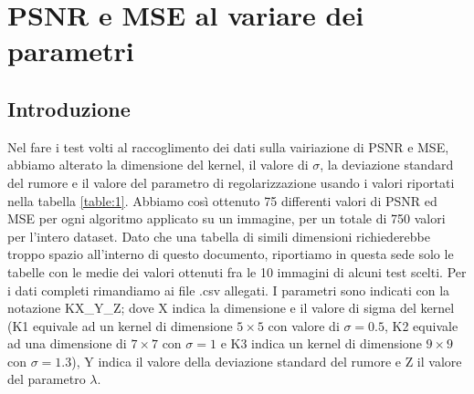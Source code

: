 \documentclass[12pt]{article}
\begin{document}
\section{PSNR e MSE al variare dei parametri}
\subsection{Introduzione}
    Nel fare i test volti al raccoglimento dei dati sulla vairiazione di PSNR e MSE, abbiamo alterato la dimensione del kernel, il valore di $\sigma$, la deviazione standard del rumore e il valore del parametro di regolarizzazione usando i valori riportati nella tabella \ref{table:1}. Abbiamo così ottenuto 75 differenti valori di PSNR ed MSE per ogni algoritmo applicato su un immagine, per un totale di 750 valori per l'intero dataset. Dato che una tabella di simili dimensioni richiederebbe troppo spazio all'interno di questo documento, riportiamo in questa sede solo le tabelle con le medie dei valori ottenuti fra le 10 immagini di alcuni test scelti. Per i dati completi rimandiamo ai file .csv allegati.
    I parametri sono indicati con la notazione KX\_Y\_Z; dove X indica la dimensione e il valore di sigma del kernel (K1 equivale ad un kernel di dimensione $5\times5$ con valore di $\sigma=0.5$, K2 equivale ad una dimensione di $7\times7$ con $\sigma=1$ e K3 indica un kernel di dimensione $9\times9$ con $\sigma=1.3$), Y indica il valore della deviazione standard del rumore e Z il valore del parametro $\lambda$.
\end{document}
